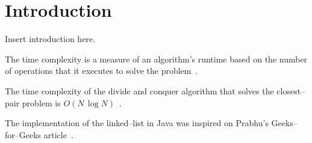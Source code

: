 \section{Introduction} %
Insert introduction here.

The time complexity is a measure of an algorithm's runtime
based on the number of operations that it executes to solve the
problem~\cite{Cormen2009}.

The time complexity of the divide and conquer algorithm that solves the
closest--pair problem is $O(N \, \log N)$~\cite{PereiraLobo2012,McConnell2008}.

The implementation of the linked--list in Java was inspired on Prabhu's
Geeks--for--Geeks article~\cite{LinkedListRishabhPrabhu}.
